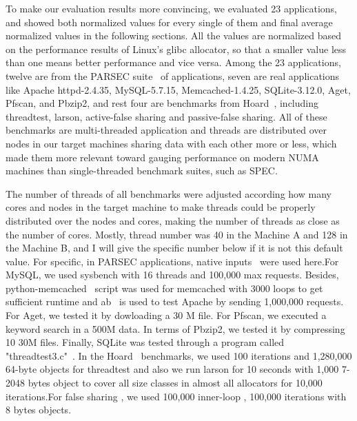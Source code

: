 To make our evaluation results more convincing, we evaluated 23 applications, and showed both normalized values for every single of them and final average normalized values in the following sections. All the values are normalized based on the performance results of Linux's glibc allocator, so that a smaller value less than one means better performance and vice versa. Among the 23 applications, twelve are from the PARSEC suite~\cite{parsec} of applications, seven are real applications like Apache httpd-2.4.35, MySQL-5.7.15, Memcached-1.4.25, SQLite-3.12.0, Aget, Pfscan, and Pbzip2, and rest four are benchmarks from Hoard~\cite{Hoard}, including threadtest, larson, active-false sharing and passive-false sharing. All of these benchmarks are multi-threaded application and threads are distributed over nodes in our target machines sharing data with each other more or less, which made them more relevant toward gauging performance on modern NUMA machines than single-threaded benchmark suites, such as SPEC.

The number of threads of all benchmarks were adjusted according how many cores and nodes in the target machine to make threads could be properly distributed over the nodes and cores, making the number of threads as close as the number of cores. Mostly, thread number was 40 in the Machine A and 128 in the Machine B, and I will give the specific number below if it is not this default value. For specific, in PARSEC applications, native inputs~\cite{parsec} were used here.For MySQL, we used sysbench with 16 threads and 100,000 max requests. Besides, python-memcached~\cite{memcached} script was used for memcached with 3000 loops to get sufficient runtime and ab~\cite{apachetest} is used to test Apache by sending 1,000,000 requests. For Aget, we tested it by dowloading a 30 M file. For Pfscan, we executed a keyword search in a 500M data. In terms of Pbzip2, we tested it by compressing 10 30M files. Finally, SQLite was tested through a program called "threadtest3.c"~\cite{sqlitetest}. In the Hoard~\cite{Hoard} benchmarks, we used 100 iterations and 1,280,000 64-byte objects for threadtest and also we run larson for 10 seconds with 1,000 7-2048 bytes object to cover all size classes in almost all allocators for 10,000 iterations.For false sharing , we used 100,000 inner-loop , 100,000 iterations with 8 bytes objects. 

